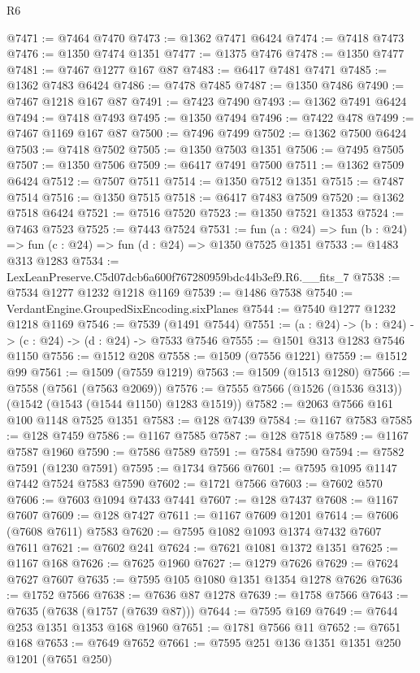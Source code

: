 \begin{lexlean}{R6}
\begin{coremodule}
@7471 := @7464 @7470
@7473 := @1362 @7471 @6424
@7474 := @7418 @7473
@7476 := @1350 @7474 @1351
@7477 := @1375 @7476
@7478 := @1350 @7477
@7481 := @7467 @1277 @167 @87
@7483 := @6417 @7481 @7471
@7485 := @1362 @7483 @6424
@7486 := @7478 @7485
@7487 := @1350 @7486
@7490 := @7467 @1218 @167 @87
@7491 := @7423 @7490
@7493 := @1362 @7491 @6424
@7494 := @7418 @7493
@7495 := @1350 @7494
@7496 := @7422 @478
@7499 := @7467 @1169 @167 @87
@7500 := @7496 @7499
@7502 := @1362 @7500 @6424
@7503 := @7418 @7502
@7505 := @1350 @7503 @1351
@7506 := @7495 @7505
@7507 := @1350 @7506
@7509 := @6417 @7491 @7500
@7511 := @1362 @7509 @6424
@7512 := @7507 @7511
@7514 := @1350 @7512 @1351
@7515 := @7487 @7514
@7516 := @1350 @7515
@7518 := @6417 @7483 @7509
@7520 := @1362 @7518 @6424
@7521 := @7516 @7520
@7523 := @1350 @7521 @1353
@7524 := @7463 @7523
@7525 := @7443 @7524
@7531 := fun (a : @24) => fun (b : @24) => fun (c : @24) => fun (d : @24) => @1350 @7525 @1351
@7533 := @1483 @313 @1283
@7534 := LexLeanPreserve.C5d07dcb6a600f767280959bdc44b3ef9.R6.__fits_7
@7538 := @7534 @1277 @1232 @1218 @1169
@7539 := @1486 @7538
@7540 := VerdantEngine.GroupedSixEncoding.sixPlanes
@7544 := @7540 @1277 @1232 @1218 @1169
@7546 := @7539 (@1491 @7544)
@7551 := (a : @24) -> (b : @24) -> (c : @24) -> (d : @24) -> @7533 @7546
@7555 := @1501 @313 @1283 @7546 @1150
@7556 := @1512 @208
@7558 := @1509 (@7556 @1221)
@7559 := @1512 @99
@7561 := @1509 (@7559 @1219)
@7563 := @1509 (@1513 @1280)
@7566 := @7558 (@7561 (@7563 @2069))
@7576 := @7555 @7566 (@1526 (@1536 @313)) (@1542 (@1543 (@1544 @1150) @1283 @1519))
@7582 := @2063 @7566 @161 @100 @1148 @7525 @1351
@7583 := @128 @7439
@7584 := @1167 @7583
@7585 := @128 @7459
@7586 := @1167 @7585
@7587 := @128 @7518
@7589 := @1167 @7587 @1960
@7590 := @7586 @7589
@7591 := @7584 @7590
@7594 := @7582 @7591 (@1230 @7591)
@7595 := @1734 @7566
@7601 := @7595 @1095 @1147 @7442 @7524 @7583 @7590
@7602 := @1721 @7566
@7603 := @7602 @570
@7606 := @7603 @1094 @7433 @7441
@7607 := @128 @7437
@7608 := @1167 @7607
@7609 := @128 @7427
@7611 := @1167 @7609 @1201
@7614 := @7606 (@7608 @7611) @7583
@7620 := @7595 @1082 @1093 @1374 @7432 @7607 @7611
@7621 := @7602 @241
@7624 := @7621 @1081 @1372 @1351
@7625 := @1167 @168
@7626 := @7625 @1960
@7627 := @1279 @7626
@7629 := @7624 @7627 @7607
@7635 := @7595 @105 @1080 @1351 @1354 @1278 @7626
@7636 := @1752 @7566
@7638 := @7636 @87 @1278
@7639 := @1758 @7566
@7643 := @7635 (@7638 (@1757 (@7639 @87)))
@7644 := @7595 @169
@7649 := @7644 @253 @1351 @1353 @168 @1960
@7651 := @1781 @7566 @11
@7652 := @7651 @168
@7653 := @7649 @7652
@7661 := @7595 @251 @136 @1351 @1351 @250 @1201 (@7651 @250)

\end{coremodule}
\end{lexlean}
